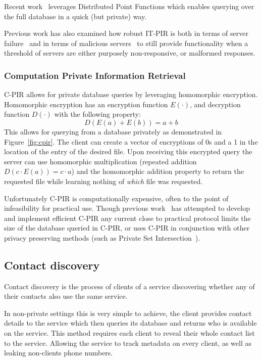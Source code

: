 Recent work~\cite{demmler2018pir} leverages Distributed Point Functions which
enables querying over the full database in a quick (but private) way.

Previous work has also examined how robust IT-PIR is both in terms of server
failure~\cite{beimel2002robust} and in terms of malicious
servers~\cite{devet2012optimally} to still provide functionality when a
threshold of servers are either purposely non-responsive, or malformed
responses.

\subsubsection{Computation Private Information Retrieval}
\computationalPIR

C-PIR allows for private database queries by leveraging homomorphic encryption. Homomorphic encryption has an encryption function $E(\cdot)$, and decryption function $D(\cdot)$ with the following property:
\[
    D(E(a) + E(b)) = a + b
\]
This allows for querying from a database privately as demonstrated in
Figure~\ref{fig:cpir}. The client can create a vector of encryptions of 0s and a
1 in the location of the entry of the desired file. Upon receiving this
encrypted query the server can use homomorphic multiplication (repeated addition
$D(c\cdot E(a)) = c\cdot a$) and the homomorphic addition property to return the
requested file while learning nothing of \textit{which} file was requested.

Unfortunately C-PIR is computationally expensive, often to the point of
infeasibility for practical use. Though previous
work~\cite{aguilar2016xpir,dong2014fast,gentry2005single} has attempted to
develop and implement efficient C-PIR any current close to practical protocol
limits the size of the database queried in C-PIR, or uses C-PIR in conjunction
with other privacy preserving methods (such as Private Set
Intersection~\cite{freedman2004efficient}).

\subsection{Contact discovery}\label{ssec:contactDiscovery}
Contact discovery is the process of clients of a service discovering whether any
of their contacts also use the same service.

In non-private settings this is very simple to achieve, the client provides
contact details to the service which then queries its database and returns who
is available on the service. This method requires each client to reveal their
whole contact list to the service. Allowing the service to track metadata on
every client, as well as leaking non-clients phone numbers.

